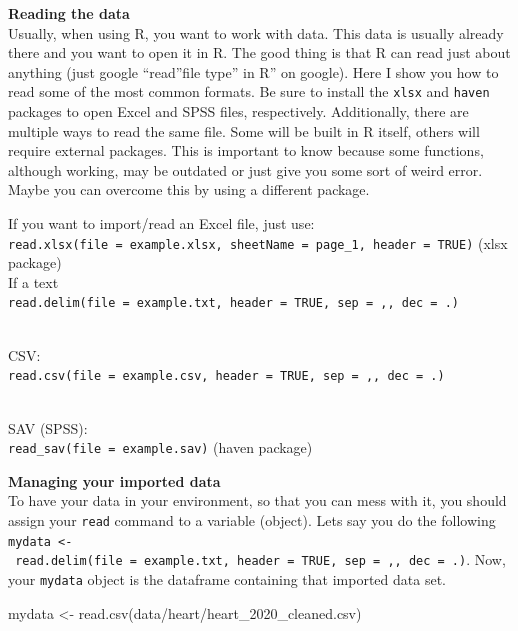 \documentclass[
]{book}
\newenvironment{Shaded}{\begin{snugshade}}{\end{snugshade}}
\newcommand{\FunctionTok}[1]{\textcolor[rgb]{0.00,0.00,0.00}{#1}}
\newcommand{\NormalTok}[1]{#1}
\newcommand{\OtherTok}[1]{\textcolor[rgb]{0.56,0.35,0.01}{#1}}
\newcommand{\StringTok}[1]{\textcolor[rgb]{0.31,0.60,0.02}{#1}}
\begin{document}
\textbf{Reading the data}\\
Usually, when using R, you want to work with data.
This data is usually already there and you want to open it in R.
The good thing is that R can read just about anything (just google ``read''file type'' in R'' on google).
Here I show you how to read some of the most common formats.
Be sure to install the \texttt{xlsx} and \texttt{haven} packages to open Excel and SPSS files, respectively.
Additionally, there are multiple ways to read the same file.
Some will be built in R itself, others will require external packages.
This is important to know because some functions, although working, may be outdated or just give you some sort of weird error.
Maybe you can overcome this by using a different package.

If you want to import/read an Excel file, just use:\\
\texttt{read.xlsx(file\ =\ \textquotesingle{}example.xlsx\textquotesingle{},\ sheetName\ =\ \textquotesingle{}page\_1\textquotesingle{},\ header\ =\ TRUE)} (xlsx package)\\
If a text\\
\texttt{read.delim(file\ =\ \textquotesingle{}example.txt\textquotesingle{},\ header\ =\ TRUE,\ sep\ =\ \textquotesingle{},\textquotesingle{},\ dec\ =\ \textquotesingle{}.\textquotesingle{})}\strut \\
CSV:\\
\texttt{read.csv(file\ =\ \textquotesingle{}example.csv\textquotesingle{},\ header\ =\ TRUE,\ sep\ =\ \textquotesingle{},\textquotesingle{},\ dec\ =\ \textquotesingle{}.\textquotesingle{})}\strut \\
SAV (SPSS):\\
\texttt{read\_sav(file\ =\ \textquotesingle{}example.sav\textquotesingle{})} (haven package)

\textbf{Managing your imported data}\\
To have your data in your environment, so that you can mess with it, you should assign your \texttt{read} command to a variable (object).
Lets say you do the following \texttt{mydata\ \textless{}-\ read.delim(file\ =\ \textquotesingle{}example.txt\textquotesingle{},\ header\ =\ TRUE,\ sep\ =\ \textquotesingle{},\textquotesingle{},\ dec\ =\ \textquotesingle{}.\textquotesingle{})}.
Now, your \texttt{mydata} object is the dataframe containing that imported data set.

\begin{Shaded}
\begin{Highlighting}[]
\NormalTok{mydata }\OtherTok{\textless{}{-}} \FunctionTok{read.csv}\NormalTok{(}\StringTok{\textquotesingle{}data/heart/heart\_2020\_cleaned.csv\textquotesingle{}}\NormalTok{)}
\end{Highlighting}
\end{Shaded}
\end{document}
